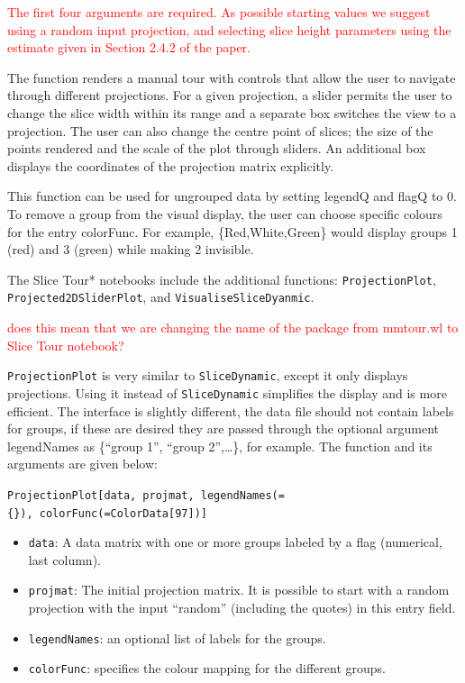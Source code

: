 \documentclass[]{interact}
\theoremstyle{plain}%
\theoremstyle{definition}
\theoremstyle{remark}
\providecommand{\tightlist}{%
  \setlength{\itemsep}{0pt}\setlength{\parskip}{0pt}}
\def\tightlist{}
\begin{document}
\textcolor{red}{The first four arguments are required. As possible starting values we suggest using a random input projection, and selecting slice height parameters using the estimate given in Section 2.4.2 of the paper.}

The function renders a manual tour with controls that allow the user to
navigate through different projections. For a given projection, a slider
permits the user to change the slice width within its range and a
separate box switches the view to a projection. The user can also change
the centre point of slices; the size of the points rendered and the
scale of the plot through sliders. An additional box displays the
coordinates of the projection matrix explicitly.

This function can be used for ungrouped data by setting legendQ and
flagQ to 0. To remove a group from the visual display, the user can
choose specific colours for the entry colorFunc. For example,
\{Red,White,Green\} would display groups 1 (red) and 3 (green) while
making 2 invisible.

The Slice Tour* notebooks include the additional functions:
\texttt{ProjectionPlot}, \texttt{Projected2DSliderPlot}, and
\texttt{VisualiseSliceDyanmic}.

\textcolor{red}{does this mean that we are changing the name of the package from mmtour.wl to Slice Tour notebook?}

\texttt{ProjectionPlot} is very similar to \texttt{SliceDynamic}, except
it only displays projections. Using it instead of \texttt{SliceDynamic}
simplifies the display and is more efficient. The interface is slightly
different, the data file should not contain labels for groups, if these
are desired they are passed through the optional argument legendNames as
\{``group 1'', ``group 2'',\ldots\}, for example. The function and its
arguments are given below:

\texttt{ProjectionPlot{[}data,\ projmat,\ legendNames(=\{\}),\ colorFunc(=ColorData{[}97{]}){]}}

\begin{itemize}
\tightlist
\item
  \texttt{data}: A data matrix with one or more groups labeled by a flag
  (numerical, last column).
\item
  \texttt{projmat}: The initial projection matrix. It is possible to
  start with a random projection with the input ``random'' (including
  the quotes) in this entry field.
\item
  \texttt{legendNames}: an optional list of labels for the groups.
\item
  \texttt{colorFunc}: specifies the colour mapping for the different
  groups.
\end{itemize}
\end{document}
